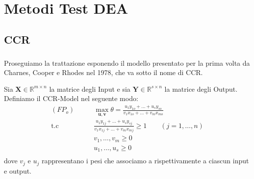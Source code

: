 \chapter{Metodi Test DEA} \label{CAP:due}
\section{CCR}
\bigskip

\paragraph{} Proseguiamo la trattazione esponendo il modello presentato per la prima volta da Charnes, Cooper e Rhodes nel 1978, che va sotto il nome di CCR.
\begin{definiz} Sia $\boldsymbol{X} \in \mathbb{R}^{m \times n}$ la matrice degli Input e sia $\boldsymbol{Y} \in \mathbb{R}^{s \times n}$  la matrice degli Output. Definiamo il CCR-Model nel seguente modo:
\begin{equation} \label{EQ:ccr-feq}
\begin{split}
(FP_o) \qquad & \max_{\boldsymbol{u,v}} \theta = \frac{u_1y_{1o} + \dots + u_sy_{so}}{v_1x_{1o} + \dots + v_mx_{mo}} \\
\text{t.c} \qquad & \frac{u_1y_{1j} + \dots + u_sy_{sj}}{v_1x_{1j} + \dots + v_mx_{mj}} \geq 1 \qquad (j=1,\dots,n)\\
& v_1,\dots,v_m \geq 0 \\
& u_1,\dots,u_s \geq 0 \\
\end{split}
\end{equation}
dove $v_j$ e $u_j$ rappresentano i pesi che associamo a rispettivamente a ciascun input e output.
\end{definiz}
